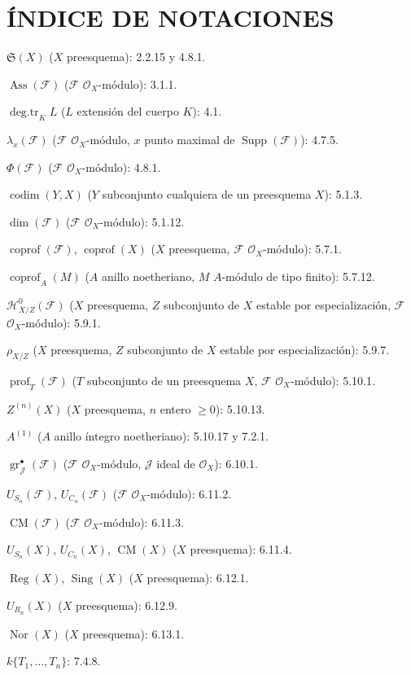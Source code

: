 \clearpage
{}
{}
\section*{ÍNDICE DE NOTACIONES}

\begingroup
\small
\setlength{\parindent}{0pt}
\setlength{\parskip}{2pt}

$\mathfrak S(X)$ ($X$ preesquema): 2.2.15 y 4.8.1.

$\operatorname{Ass}(\mathscr F)$ ($\mathscr F$ $\mathcal O_X$-módulo): 3.1.1.

$\operatorname{deg.tr}_K L$ ($L$ extensión del cuerpo $K$): 4.1.

$\lambda_x(\mathscr F)$ ($\mathscr F$ $\mathcal O_X$-módulo, $x$ punto maximal
de $\operatorname{Supp}(\mathscr F)$): 4.7.5.

$\Phi(\mathscr F)$ ($\mathscr F$ $\mathcal O_X$-módulo): 4.8.1.

$\operatorname{codim}(Y,X)$ ($Y$ subconjunto cualquiera de un preesquema $X$): 5.1.3.

$\dim(\mathscr F)$ ($\mathscr F$ $\mathcal O_X$-módulo): 5.1.12.

$\operatorname{coprof}(\mathscr F)$, $\operatorname{coprof}(X)$ ($X$
preesquema, $\mathscr F$ $\mathcal O_X$-módulo): 5.7.1.

$\operatorname{coprof}_A(M)$ ($A$ anillo noetheriano, $M$ $A$-módulo de tipo
finito): 5.7.12.

$\mathcal H^0_{X/Z}(\mathscr F)$ ($X$ preesquema, $Z$ subconjunto de $X$ estable por
especialización, $\mathscr F$ $\mathcal O_X$-módulo): 5.9.1.

$\rho_{X/Z}$ ($X$ preesquema, $Z$ subconjunto de $X$ estable por
especialización): 5.9.7.

$\operatorname{prof}_T(\mathscr F)$ ($T$ subconjunto de un preesquema $X$, $\mathscr F$
$\mathcal O_X$-módulo): 5.10.1.

$Z^{(n)}(X)$ ($X$ preesquema, $n$ entero $\geq0$): 5.10.13.

$A^{(1)}$ ($A$ anillo íntegro noetheriano): 5.10.17 y 7.2.1.

$\operatorname{gr}_{\mathscr J}^{\bullet}(\mathscr F)$ ($\mathscr F$
$\mathcal O_X$-módulo, $\mathscr J$ ideal de $\mathcal O_X$): 6.10.1.

$U_{S_n}(\mathscr F)$, $U_{C_n}(\mathscr F)$ ($\mathscr F$
$\mathcal O_X$-módulo): 6.11.2.

$\operatorname{CM}(\mathscr F)$ ($\mathscr F$ $\mathcal O_X$-módulo): 6.11.3.

$U_{S_n}(X)$, $U_{C_n}(X)$, $\operatorname{CM}(X)$ ($X$ preesquema): 6.11.4.

$\operatorname{Reg}(X)$, $\operatorname{Sing}(X)$ ($X$ preesquema): 6.12.1.

$U_{R_n}(X)$ ($X$ preesquema): 6.12.9.

$\operatorname{Nor}(X)$ ($X$ preesquema): 6.13.1.

$k\{T_1,\ldots,T_n\}$: 7.4.8.

\endgroup
